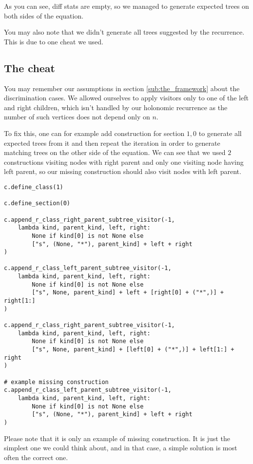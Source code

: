 \documentclass[final]{article}
\theoremstyle{definition}
\theoremstyle{remark}
\begin{document}
As you can see, diff stats are empty, so we managed to generate expected trees on both sides of the equation.

You may also note that we didn't generate all trees suggested by the recurrence. This is due to one cheat we used.

\subsection{The cheat}%
\label{sub:the_cheat}

You may remember our assumptions in section \ref{sub:the_framework} about the discrimination cases. We allowed ourselves to apply visitors only to one of the left and right children, which isn't handled by our holonomic recurrence as the number of such vertices does not depend only on \(n\).

To fix this, one can for example add construction for section \(1, 0\) to generate all expected trees from it and then repeat the iteration in order to generate matching trees on the other side of the equation. We can see that we used \(2\) constructions visiting nodes with right parent and only one visiting node having left parent, so our missing construction should also visit nodes with left parent.

\begin{lstlisting}
c.define_class(1)

c.define_section(0)

c.append_r_class_right_parent_subtree_visitor(-1,
    lambda kind, parent_kind, left, right:
        None if kind[0] is not None else
        ["s", (None, "*"), parent_kind] + left + right
)

c.append_r_class_left_parent_subtree_visitor(-1,
    lambda kind, parent_kind, left, right:
        None if kind[0] is not None else
        ["s", None, parent_kind] + left + [right[0] + ("*",)] + right[1:]
)

c.append_r_class_right_parent_subtree_visitor(-1,
    lambda kind, parent_kind, left, right:
        None if kind[0] is not None else
        ["s", None, parent_kind] + [left[0] + ("*",)] + left[1:] + right
)

# example missing construction
c.append_r_class_left_parent_subtree_visitor(-1,
    lambda kind, parent_kind, left, right:
        None if kind[0] is not None else
        ["s", (None, "*"), parent_kind] + left + right
)
\end{lstlisting}

Please note that it is only an example of missing construction. It is just the simplest one we could think about, and in that case, a simple solution is most often the correct one.
\end{document}
